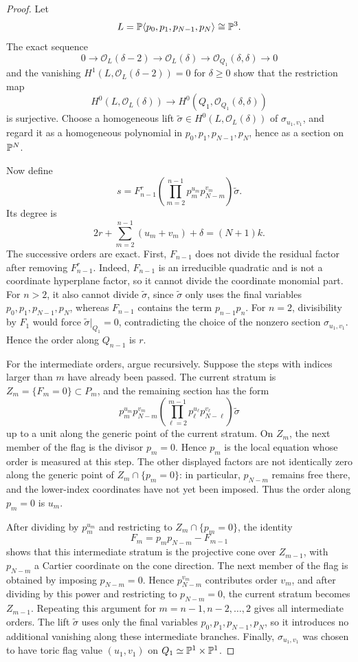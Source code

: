 \begin{proof}
Let
\[
L=\mathbb{P}\langle p_0,p_1,p_{N-1},p_N\rangle\cong\mathbb{P}^3.
\]
The exact sequence
\[
0\to\mathcal O_L(\delta-2)\to\mathcal O_L(\delta)\to\mathcal O_{Q_1}(\delta,\delta)\to0
\]
and the vanishing \(H^1(L,\mathcal O_L(\delta-2))=0\) for \(\delta\ge0\) show that the restriction map
\[
H^0(L,\mathcal O_L(\delta))\longrightarrow H^0(Q_1,\mathcal O_{Q_1}(\delta,\delta))
\]
is surjective. Choose a homogeneous lift \(\widetilde\sigma\in H^0(L,\mathcal O_L(\delta))\) of \(\sigma_{u_1,v_1}\), and regard it as a homogeneous polynomial in \(p_0,p_1,p_{N-1},p_N\), hence as a section on \(\mathbb{P}^N\).

Now define
\[
s=
F_{n-1}^r
\left(\prod_{m=2}^{n-1}p_m^{u_m}p_{N-m}^{v_m}\right)
\widetilde\sigma.
\]
Its degree is
\[
2r+
\sum_{m=2}^{n-1}(u_m+v_m)+\delta
=
(N+1)k.
\]
The successive orders are exact. First, \(F_{n-1}\) does not divide the residual factor after removing \(F_{n-1}^r\). Indeed, \(F_{n-1}\) is an irreducible quadratic and is not a coordinate hyperplane factor, so it cannot divide the coordinate monomial part. For \(n>2\), it also cannot divide \(\widetilde\sigma\), since \(\widetilde\sigma\) only uses the final variables \(p_0,p_1,p_{N-1},p_N\), whereas \(F_{n-1}\) contains the term \(p_{n-1}p_n\). For \(n=2\), divisibility by \(F_1\) would force \(\widetilde\sigma|_{Q_1}=0\), contradicting the choice of the nonzero section \(\sigma_{u_1,v_1}\). Hence the order along \(Q_{n-1}\) is \(r\).

For the intermediate orders, argue recursively. Suppose the steps with indices larger than \(m\) have already been passed. The current stratum is \(Z_m=\{F_m=0\}\subset P_m\), and the remaining section has the form
\[
p_m^{u_m}p_{N-m}^{v_m}
\left(\prod_{\ell=2}^{m-1}p_\ell^{u_\ell}p_{N-\ell}^{v_\ell}\right)
\widetilde\sigma
\]
up to a unit along the generic point of the current stratum. On \(Z_m\), the next member of the flag is the divisor \(p_m=0\). Hence \(p_m\) is the local equation whose order is measured at this step. The other displayed factors are not identically zero along the generic point of \(Z_m\cap\{p_m=0\}\): in particular, \(p_{N-m}\) remains free there, and the lower-index coordinates have not yet been imposed. Thus the order along \(p_m=0\) is \(u_m\).

After dividing by \(p_m^{u_m}\) and restricting to \(Z_m\cap\{p_m=0\}\), the identity
\[
F_m=p_mp_{N-m}-F_{m-1}
\]
shows that this intermediate stratum is the projective cone over \(Z_{m-1}\), with \(p_{N-m}\) a Cartier coordinate on the cone direction. The next member of the flag is obtained by imposing \(p_{N-m}=0\). Hence \(p_{N-m}^{v_m}\) contributes order \(v_m\), and after dividing by this power and restricting to \(p_{N-m}=0\), the current stratum becomes \(Z_{m-1}\). Repeating this argument for \(m=n-1,n-2,\ldots,2\) gives all intermediate orders. The lift \(\widetilde\sigma\) uses only the final variables \(p_0,p_1,p_{N-1},p_N\), so it introduces no additional vanishing along these intermediate branches. Finally, \(\sigma_{u_1,v_1}\) was chosen to have toric flag value \((u_1,v_1)\) on \(Q_1\simeq\mathbb{P}^1\times\mathbb{P}^1\).


\end{proof}
